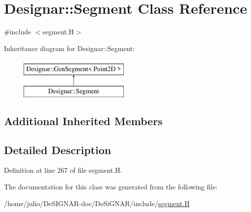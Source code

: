 \hypertarget{class_designar_1_1_segment}{}\section{Designar\+:\+:Segment Class Reference}
\label{class_designar_1_1_segment}


{\ttfamily \#include $<$segment.\+H$>$}

Inheritance diagram for Designar\+:\+:Segment\+:\begin{figure}[H]
\begin{center}
\leavevmode
\includegraphics[height=2.000000cm]{class_designar_1_1_segment}
\end{center}
\end{figure}
\subsection*{Additional Inherited Members}


\subsection{Detailed Description}


Definition at line 267 of file segment.\+H.



The documentation for this class was generated from the following file\+:\begin{DoxyCompactItemize}
\item 
/home/julio/\+De\+S\+I\+G\+N\+A\+R-\/doc/\+De\+Si\+G\+N\+A\+R/include/\hyperlink{segment_8_h}{segment.\+H}\end{DoxyCompactItemize}
